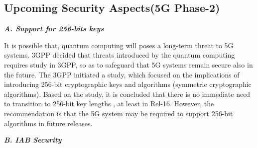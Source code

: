 \begin{multicols}{2}
\section{Upcoming Security Aspects\hfill\break (5G Phase-2)}

\noindent
{\bf {\textit{A. Support for 256-bits keys}}}

It is possible that, quantum computing \cite{art4-key05} will poses a long-term threat to 5G systems. 3GPP decided that threats introduced by the quantum computing requires study in 3GPP, so as to safeguard that 5G systems remain secure also in the future. The 3GPP initiated a study, which focused on the implications of introducing 256-bit cryptographic keys and algorithms (symmetric cryptographic algorithms). Based on the study, it is concluded that there is no immediate need to transition to 256-bit key lengths \cite{art4-key06}, at least in Rel-16. However, the recommendation is that the 5G system may be required to support 256-bit algorithms in future releases.

\noindent
{\bf {\textit{B. IAB Security}}}


\end{multicols}
